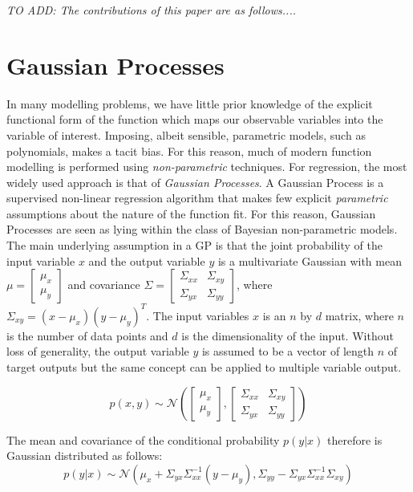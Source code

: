 \documentclass[useAMS,usenatbib,fleqn]{mn2e}
\begin{document}
\textit{TO ADD: The contributions of this paper are as follows....}

\section{Gaussian Processes}
\label{sec-gaussian-process}
In many modelling problems, we have little prior knowledge of the explicit functional form of the function which maps our observable variables into the variable of interest. Imposing, albeit sensible, parametric models, such as polynomials, makes a tacit bias. For this reason, much of modern function modelling is performed using \emph{non-parametric} techniques. For regression, the most widely used approach is that of \emph{Gaussian Processes}.
A Gaussian Process is a supervised non-linear regression algorithm that makes few explicit \emph{parametric} assumptions about the nature of the function fit. For this reason, Gaussian Processes are seen as lying within the class of Bayesian non-parametric models. The main underlying assumption in a GP is that the joint probability of the input variable $x$ and the output variable $y$ is a multivariate Gaussian with mean $\mu=\begin{bmatrix} \mu_{x}\\ \mu_{y}\end{bmatrix}$ and covariance $\Sigma=\begin{bmatrix}\Sigma_{xx} & \Sigma_{xy}\\\Sigma_{yx} & \Sigma_{yy} \end{bmatrix}$, where $\Sigma_{xy}=(x-\mu_{x})(y-\mu_{y})^{T}$. The input variables $x$ is an $n$ by $d$ matrix, where $n$ is the number of data points and $d$ is the dimensionality of the input. Without loss of generality, the output variable $y$ is assumed to be a vector of length $n$ of target outputs but the same concept can be applied to multiple variable output.

\begin{equation}
p\left ( x,y\right) \sim \mathcal{N} \left ( \begin{bmatrix}\mu_{x}\\\mu_{y} \end{bmatrix}, \begin{bmatrix}\Sigma_{xx} & \Sigma_{xy}\\\Sigma_{yx} & \Sigma_{yy} \end{bmatrix}\right )
\end{equation}

The mean and covariance of the conditional probability $p(y|x)$ therefore is Gaussian distributed as follows:
\begin{equation}
p(y|x) \sim  \mathcal{N} \left ( \mu_{x}+\Sigma_{yx}\Sigma_{xx}^{-1}\left ( y-\mu_{y}\right ), \Sigma_{yy}-\Sigma_{yx}\Sigma_{xx}^{-1}\Sigma_{xy}\right )
\end{equation}
\end{document}

